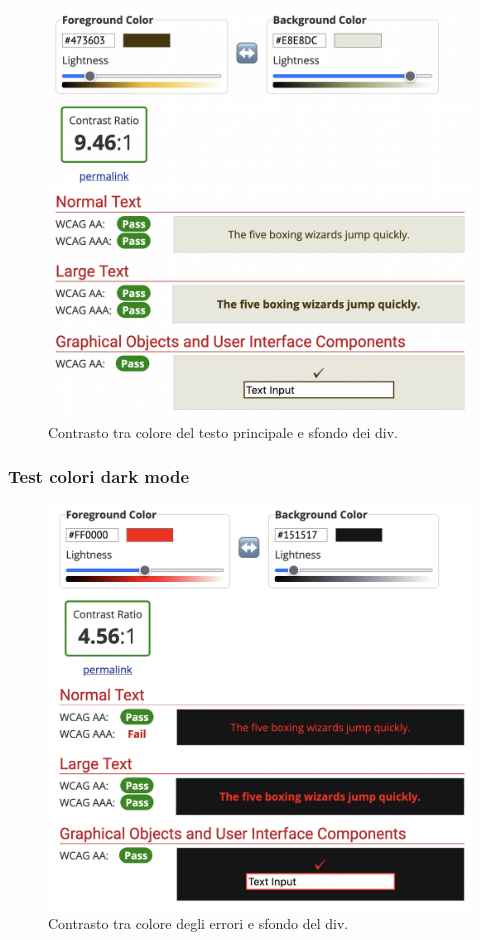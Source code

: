 \documentclass[a4paper]{article}
\begin{document}
	\begin{figure}[H]
		\centering
		\includegraphics[scale=0.3]{immagini/controllo-colori/light-mode/testo-principale_sfondo-div.png}
		\caption{Contrasto tra colore del testo principale e sfondo dei div.}
	\end{figure}

	\subsubsection{Test colori dark mode}
	\begin{figure}[H]
		\centering
		\includegraphics[scale=0.3]{immagini/controllo-colori/dark-mode/errore_sfondo-div.png}
		\caption{Contrasto tra colore degli errori e sfondo del div.}
	\end{figure}
\end{document}

